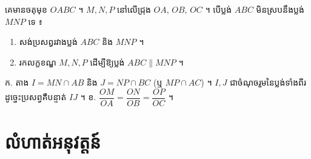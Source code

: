 \begin{pro}
គេមានចតុមុខ $OABC$ ។ $M, N, P$ នៅលើជ្រុង $OA$, $OB$, $OC$ ។ បើប្លង់ $ABC$ មិនស្របនឹងប្លង់ $MNP$ ទេ ៖
\begin{enumerate}[a]
  \item សង់ប្រសព្វរវាងប្លង់ $ABC$ និង $MNP$ ។
  \item រកលក្ខខណ្ឌ $M, N, P$ ដើម្បីឱ្យប្លង់ $ABC \parallel MNP$ ។
\end{enumerate}
\ans
ក. តាង $I = MN \cap AB$ និង $J = NP \cap BC$ (ឬ $MP \cap AC$) ។ $I, J$ ជាចំណុចរួមនៃប្លង់ទាំងពីរ ដូច្នេះប្រសព្វគឺបន្ទាត់ $IJ$ ។ \quad ខ. $\dfrac{OM}{OA} = \dfrac{ON}{OB} = \dfrac{OP}{OC}$ ។
\end{pro}

\section*{លំហាត់អនុវត្តន៍}
